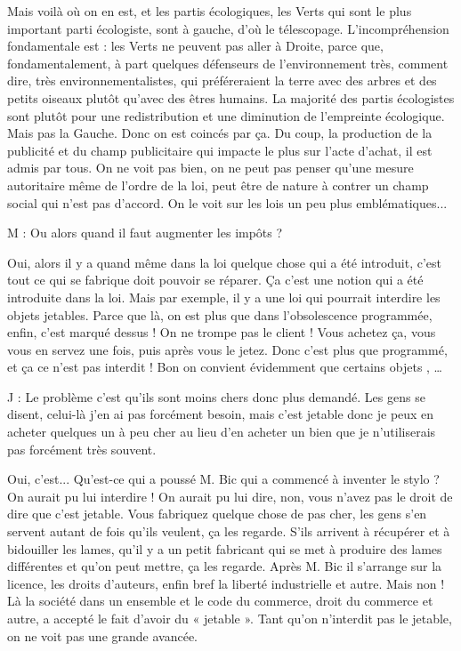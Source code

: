 \begin{description}
Mais voilà où on en est, et les partis écologiques, les Verts qui sont  le plus important parti écologiste, sont à gauche, d'où le télescopage. L’incompréhension fondamentale est : les Verts ne peuvent pas aller à Droite, parce que, fondamentalement, à part quelques défenseurs de l'environnement très, comment dire, très environnementalistes, qui préféreraient la terre avec des arbres et des petits oiseaux plutôt qu'avec des êtres humains. La majorité des partis écologistes sont plutôt pour une redistribution et une diminution de l'empreinte écologique. Mais pas la Gauche. Donc on est coincés par ça. Du coup, la production de la publicité et du champ publicitaire qui impacte le plus sur l'acte d'achat, il est admis par tous. On ne voit pas bien, on ne peut pas penser qu'une mesure autoritaire même de l'ordre de la loi, peut être de nature à contrer un champ social qui n'est pas d'accord. On le voit sur les lois un peu plus emblématiques...

\vspace{1\baselineskip}

M : Ou alors quand il faut augmenter les impôts ?

\vspace{1\baselineskip}

Oui, alors il y a quand même dans la loi quelque chose qui a été introduit, c'est tout ce qui se fabrique doit pouvoir se réparer. Ça c'est une notion qui a été introduite dans la loi. Mais par exemple, il y a une loi qui pourrait interdire les objets jetables. Parce que là, on est plus que dans l'obsolescence programmée, enfin, c'est marqué dessus ! On ne trompe pas le client ! Vous achetez ça, vous vous en servez une fois, puis après vous le jetez. Donc c'est plus que programmé, et ça ce n’est pas interdit ! Bon on convient évidemment que certains objets , …

\vspace{1\baselineskip}

J : Le problème c'est qu'ils sont moins chers donc plus demandé. Les gens se disent, celui-là j'en ai pas forcément besoin, mais c'est jetable donc je peux en acheter quelques un à peu cher au lieu d'en acheter un bien que je n'utiliserais pas forcément très souvent.

\vspace{1\baselineskip}

Oui, c'est... Qu'est-ce qui a poussé M. Bic qui a commencé à inventer le stylo ? On aurait pu lui interdire ! On aurait pu lui dire, non, vous n'avez pas le droit de dire que c'est jetable. Vous fabriquez quelque chose de pas cher, les gens s'en servent autant de fois qu'ils veulent, ça les regarde. S’ils arrivent à récupérer et à bidouiller les lames, qu'il y a un petit fabricant qui se met à produire des lames différentes et qu'on peut mettre, ça les regarde. Après M. Bic il s'arrange sur la licence, les droits d'auteurs, enfin bref la liberté industrielle et autre. Mais non ! Là la société dans un ensemble et le code du commerce, droit du commerce et autre, a accepté le fait d'avoir du « jetable ». Tant qu’on n’interdit pas le jetable, on ne voit pas une grande avancée. 


\end{description}
